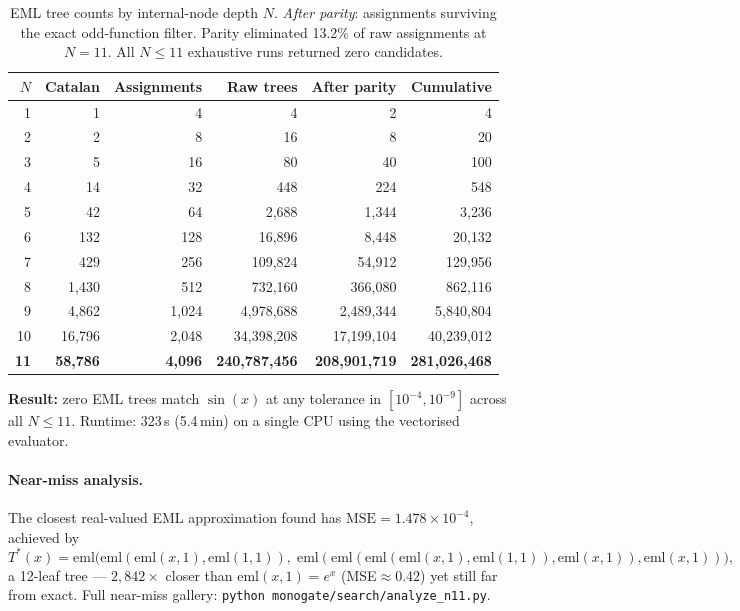 \documentclass[11pt,a4paper]{article}
\begin{document}
\begin{table}[h]
\centering
\begin{tabular}{@{}rrrrrr@{}}
\toprule
$N$ & Catalan & Assignments & Raw trees & After parity & Cumulative \\
\midrule
1  &         1 &      4 &            4 &             2 &             4 \\
2  &         2 &      8 &           16 &             8 &            20 \\
3  &         5 &     16 &           80 &            40 &           100 \\
4  &        14 &     32 &          448 &           224 &           548 \\
5  &        42 &     64 &        2{,}688 &         1{,}344 &         3{,}236 \\
6  &       132 &    128 &       16{,}896 &         8{,}448 &        20{,}132 \\
7  &       429 &    256 &      109{,}824 &        54{,}912 &       129{,}956 \\
8  &     1{,}430 &    512 &      732{,}160 &       366{,}080 &       862{,}116 \\
9  &     4{,}862 &  1{,}024 &    4{,}978{,}688 &     2{,}489{,}344 &     5{,}840{,}804 \\
10 &    16{,}796 &  2{,}048 &   34{,}398{,}208 &    17{,}199{,}104 &    40{,}239{,}012 \\
\textbf{11} & \textbf{58{,}786} & \textbf{4{,}096}
   & \textbf{240{,}787{,}456} & \textbf{208{,}901{,}719}
   & \textbf{281{,}026{,}468} \\
\bottomrule
\end{tabular}
\caption{EML tree counts by internal-node depth $N$.
  \textit{After parity}: assignments surviving the exact odd-function filter.
  Parity eliminated 13.2\% of raw assignments at $N=11$.
  All $N\leq11$ exhaustive runs returned zero candidates.}
\label{tab:tree_counts}
\end{table}

\textbf{Result:} zero EML trees match $\sin(x)$ at any tolerance in
$[10^{-4},10^{-9}]$ across all $N\leq11$.
Runtime: 323\,s (5.4\,min) on a single CPU using the vectorised evaluator.

\paragraph{Near-miss analysis.}
The closest real-valued EML approximation found has
$\mathrm{MSE}=1.478\times10^{-4}$, achieved by
\[
  T^*(x) = \mathrm{eml}\!\bigl(\mathrm{eml}(\mathrm{eml}(x,1),\mathrm{eml}(1,1)),\;
             \mathrm{eml}(\mathrm{eml}(\mathrm{eml}(\mathrm{eml}(x,1),\mathrm{eml}(1,1)),
             \mathrm{eml}(x,1)),\mathrm{eml}(x,1))\bigr),
\]
a 12-leaf tree --- $2{,}842\times$ closer than $\mathrm{eml}(x,1)=e^x$
(MSE$\approx0.42$) yet still far from exact.
Full near-miss gallery: \texttt{python monogate/search/analyze\_n11.py}.
\end{document}
